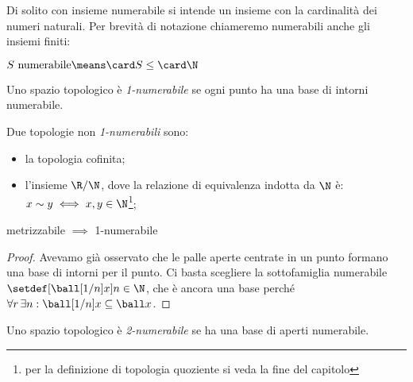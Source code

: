 
Di solito con insieme numerabile si intende un insieme con la cardinalità dei numeri naturali. Per brevità di notazione chiameremo numerabili anche gli insiemi finiti:

\begin{defn}[Numerabilità]
	$S\text{ numerabile}\means\card S\leq\card\N$
\end{defn}

\begin{defn}[1-numerabilità]
	Uno spazio topologico è \emph{1-numerabile} se ogni punto ha una base di intorni numerabile.
\end{defn}

\begin{es}
Due topologie non \emph{1-numerabili} sono:
\begin{itemize}
\item la topologia cofinita;
\item l'insieme $\R / \N$, dove la relazione di equivalenza indotta da $\N$ è: $x \sim y \iff x, y \in \N$\footnote{per la definizione di topologia quoziente si veda la fine del capitolo};
\end{itemize}
\end{es}

\begin{prop}
	metrizzabile $\implies$ 1-numerabile
\end{prop}

\begin{proof}
	Avevamo già osservato che le palle aperte centrate in un punto formano una base di intorni per il punto.
	Ci basta scegliere la sottofamiglia numerabile $\setdef[{\ball[1/n]x}]{n\in\N}$,
	che è ancora una base perché $\forall r\,\exists n:\ball[1/n]x\subseteq\ball x$.
\end{proof}

\begin{defn}[2-numerabilità]
	Uno spazio topologico è \emph{2-numerabile} se ha una base di aperti numerabile.
\end{defn}
